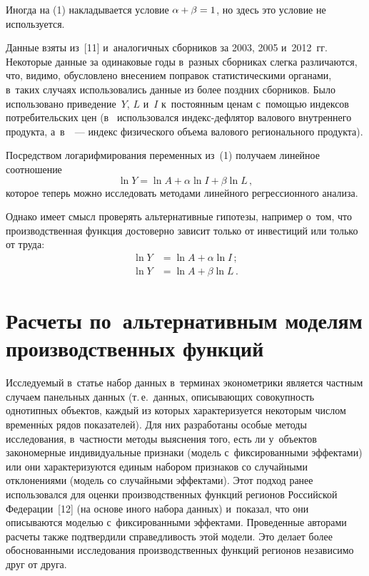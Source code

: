 \begin{multicols}{2}
  Иногда на (1) накладывается условие $\alpha\hm+\beta\hm=1$, но здесь это условие не 
используется.
  
  Данные взяты из~[11] и~аналогичных сборников\linebreak
   за 2003, 2005 и~2012~гг. Некоторые 
данные за одинаковые годы в~разных сборниках слегка различаются, что, видимо, 
обусловлено внесением поправок статистическими органами, в~таких случаях\linebreak 
использовались данные из более поздних сборников. Было использовано 
приведение~$Y$, $L$ и~$I$ к~постоянным ценам с~по\-мощью индексов потребительских 
цен (в~\cite{7-ki} использовался ин\-декс-дефля\-тор валового внут\-рен\-не\-го
продукта, а~в~\cite{8-ki}~--- индекс 
физического объема валового регионального продукта).
  
  Посредством логарифмирования переменных из~(1) получаем линейное соотношение
  \begin{equation}
  \ln Y=\ln A+\alpha \ln I+\beta \ln L\,,
  \end{equation}
которое теперь можно исследовать методами линейного регрессионного анализа.
  
  Однако имеет смысл проверять альтернативные гипотезы, например о~том, что 
производственная функция достоверно зависит только от инвестиций или только от 
труда: 
  \begin{align}
  \ln Y&= \ln A+\alpha \ln I\,;\label{e-ki}\\
  \ln Y &= \ln A+\beta \ln L\,. \label{e4-ki}
  \end{align} 

\section{Расчеты по~альтернативным моделям производственных 
функций}

  Исследуемый в~статье набор данных в~терминах эконометрики является частным 
случаем панельных данных (т.\,е.\ данных, описывающих совокупность однотипных 
объектов, каждый из которых характеризуется некоторым числом временн$\acute{\mbox{ы}}$х рядов 
показателей). Для них разработаны особые методы исследования, в~частности методы 
выяснения того, есть ли у~объектов закономерные индивидуальные признаки (модель 
с~фиксированными эффектами) или они характеризуются единым набором признаков со 
случайными отклонениями (модель со случайными эффектами). Этот подход ранее 
использовался для оценки производственных функций регионов Российской 
Федерации~[12] (на основе иного набора данных) и~показал, что они\linebreak
 описываются 
моделью с~фиксированными эф\-фектами. Проведенные авторами расчеты также 
подтвердили справедливость этой модели. Это делает более обоснованными 
исследования производственных функций регионов независимо друг от друга. 
  

\end{multicols}
